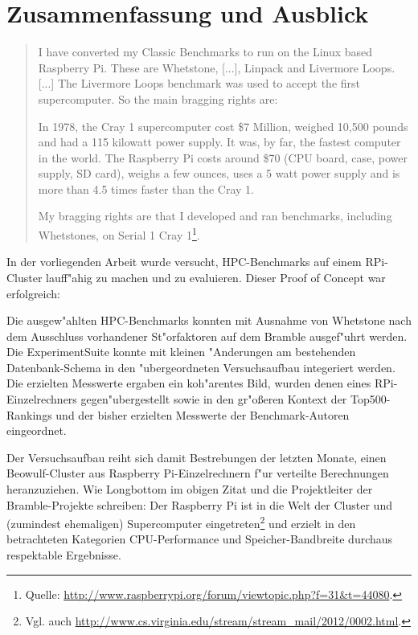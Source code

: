 \chapter{Zusammenfassung und Ausblick}\label{Kapitel 5}
\begin{quote}
\onehalfspacing
I have converted my Classic Benchmarks to run on the Linux based Raspberry Pi. These are Whetstone, [...], Linpack and Livermore Loops. [...] The Livermore Loops benchmark was used to accept the first supercomputer. So the main bragging rights are:

In 1978, the Cray 1 supercomputer cost \$7 Million, weighed 10,500 pounds and had a 115 kilowatt power supply. It was, by far, the fastest computer in the world. The Raspberry Pi costs around \$70 (CPU board, case, power supply, SD card), weighs a few ounces, uses a 5 watt power supply and is more than 4.5 times faster than the Cray 1. 

My bragging rights are that I developed and ran benchmarks, including Whetstones, on Serial 1 Cray 1\footnote{Quelle: \url{http://www.raspberrypi.org/forum/viewtopic.php?f=31&t=44080}.}.
\end{quote}

In der vorliegenden Arbeit wurde versucht, HPC-Benchmarks auf einem RPi-Cluster lauff"ahig zu machen und zu evaluieren. Dieser Proof of Concept war erfolgreich: 

Die ausgew"ahlten HPC-Benchmarks konnten mit Ausnahme von Whetstone nach dem Ausschluss vorhandener St"orfaktoren auf dem Bramble ausgef"uhrt werden. Die ExperimentSuite konnte mit kleinen "Anderungen am bestehenden Datenbank-Schema in den "ubergeordneten Versuchsaufbau integeriert werden. Die erzielten Messwerte ergaben ein koh"arentes Bild, wurden denen eines RPi-Einzelrechners gegen"ubergestellt sowie in den gr"o\ss eren Kontext der Top500-Rankings und der bisher erzielten Messwerte der Benchmark-Autoren eingeordnet. 

Der Versuchsaufbau reiht sich damit Bestrebungen der letzten Monate, einen Beowulf-Cluster aus Raspberry Pi-Einzelrechnern f"ur verteilte Berechnungen heranzuziehen. Wie Longbottom im obigen Zitat und die Projektleiter der Bramble-Projekte schreiben: Der Raspberry Pi ist in die Welt der Cluster und (zumindest ehemaligen) Supercomputer eingetreten\footnote{Vgl. auch \url{http://www.cs.virginia.edu/stream/stream_mail/2012/0002.html}.} und erzielt in den betrachteten Kategorien CPU-Performance und Speicher-Band\-breite durchaus respektable Ergebnisse. 

